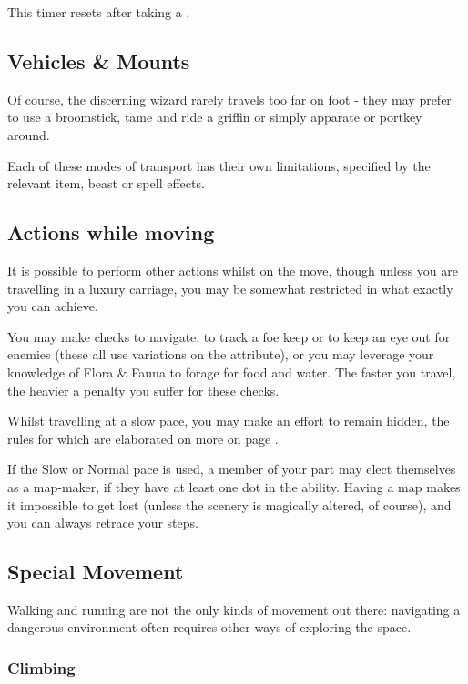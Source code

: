 This timer resets after taking a .

\subsection{Vehicles \& Mounts}

Of course, the discerning wizard rarely travels too far on foot - they may prefer to use a broomstick, tame and ride a griffin or simply apparate or portkey around. 

Each of these modes of transport has their own limitations, specified by the relevant item, beast or spell effects. 

\subsection{Actions while moving}

It is possible to perform other actions whilst on the move, though unless you are travelling in a luxury carriage, you may be somewhat restricted in what exactly you can achieve. 

You may make checks to navigate, to track a foe keep or to keep an eye out for enemies (these all use variations on the \attPer{} attribute), or you may leverage your knowledge of Flora \& Fauna to forage for food and water. The faster you travel, the heavier a penalty you suffer for these checks. 

Whilst travelling at a slow pace, you may make an effort to remain hidden, the rules for which are elaborated on more on page \pageref{S:Stealth}. 

If the Slow or Normal pace is used, a member of your part may elect themselves as a map-maker, if they have at least one dot in the  ability. Having a map makes it impossible to get lost (unless the scenery is magically altered, of course), and you can always retrace your steps. 

\subsection{Special Movement}\label{S:SpecialMovement}

Walking and running are not the only kinds of movement out there: navigating a dangerous environment often requires other ways of exploring the space. 

\subsubsection{Climbing}

